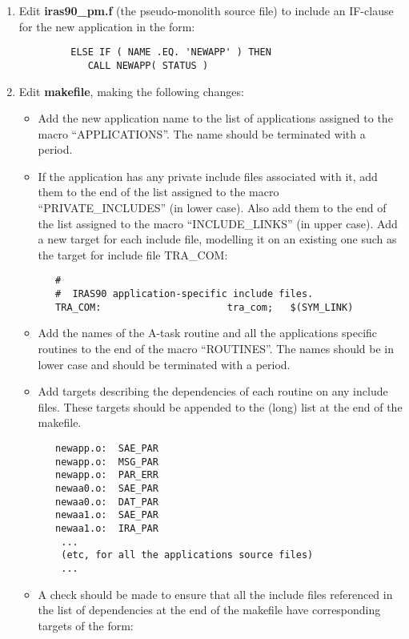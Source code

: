 \begin{enumerate}
\item Edit {\bf iras90\_pm.f} (the pseudo-monolith source file) to include an 
IF-clause for the new application in the form:

\small
\begin{verbatim}
         ELSE IF ( NAME .EQ. 'NEWAPP' ) THEN
            CALL NEWAPP( STATUS )
\end{verbatim}
\normalsize

\item Edit {\bf makefile}, making the following changes:
\begin{itemize}
\item Add the new application name to the list of applications
assigned to the macro ``{\small APPLICATIONS}''. The name should be terminated
with a period. 
\item If the application has any private include files associated with it, add 
them to the end of the list assigned to the macro ``{\small PRIVATE\_INCLUDES}'' 
(in lower case). Also add them to the end of the list assigned to the macro 
``{\small INCLUDE\_LINKS}'' (in upper case). Add a new target for each include 
file, modelling it on an existing one such as the target for include file
{\small TRA\_COM}:

\small 
\begin{verbatim}
   #
   #  IRAS90 application-specific include files.
   TRA_COM:                      tra_com;   $(SYM_LINK)
\end{verbatim}
\normalsize

\item Add the names of the A-task routine and all the applications specific 
routines to the end of the macro ``{\small ROUTINES}''. The names should be in 
lower case and should be terminated with a period.

\item Add targets describing the dependencies of each routine on any include 
files. These targets should be appended to the (long) list at the end of the 
makefile.

\small
\begin{verbatim}
   newapp.o:  SAE_PAR
   newapp.o:  MSG_PAR
   newapp.o:  PAR_ERR
   newaa0.o:  SAE_PAR
   newaa0.o:  DAT_PAR
   newaa1.o:  SAE_PAR
   newaa1.o:  IRA_PAR
    ...
    (etc, for all the applications source files)
    ...
\end{verbatim}

\item A check should be made to ensure that all the include files referenced in 
the list of dependencies at the end of the makefile have corresponding targets 
of the form:


\end{itemize}
\end{enumerate}
